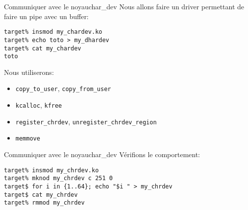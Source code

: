 \begin{frame}[fragile=singleslide]{Communiquer avec le noyau}{char\_dev}
  Nous allons faire un driver permettant de faire un pipe avec un buffer:
  \begin{lstlisting}
target% insmod my_chardev.ko
target% echo toto > my_dhardev
target% cat my_chardev
toto
  \end{lstlisting}
  Nous utiliserons:
  \begin{itemize}
  \item \verb+copy_to_user+, \verb+copy_from_user+
  \item \verb+kcalloc+, \verb+kfree+
  \item \verb+register_chrdev+, \verb+unregister_chrdev_region+
  \item \verb+memmove+
  \end{itemize}
\end{frame}

\begin{frame}[fragile=singleslide]{Communiquer avec le noyau}{char\_dev}
   Vérifions le comportement:
   \begin{lstlisting}
target% insmod my_chrdev.ko
target% mknod my_chrdev c 251 0
target$ for i in {1..64}; echo "$i " > my_chrdev
target$ cat my_chrdev
target% rmmod my_chrdev
    \end{lstlisting} %
\end{frame}
 


